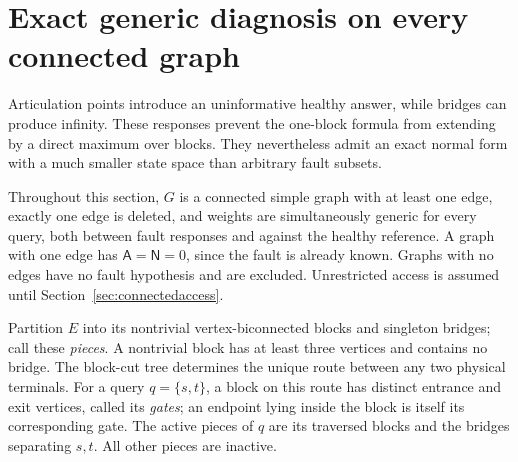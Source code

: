 \documentclass[11pt,letterpaper]{article}
\newcommand{\A}{\mathsf A}
\newcommand{\N}{\mathsf N}
\begin{document}
\section{Exact generic diagnosis on every connected graph}\label{sec:connected}
Articulation points introduce an uninformative healthy answer, while bridges can produce infinity. These responses prevent the one-block formula from extending by a direct maximum over blocks. They nevertheless admit an exact normal form with a much smaller state space than arbitrary fault subsets.

Throughout this section, $G$ is a connected simple graph with at least one edge, exactly one edge is deleted, and weights are simultaneously generic for every query, both between fault responses and against the healthy reference. A graph with one edge has $\A=\N=0$, since the fault is already known. Graphs with no edges have no fault hypothesis and are excluded. Unrestricted access is assumed until Section~\ref{sec:connectedaccess}.

Partition $E$ into its nontrivial vertex-biconnected blocks and singleton bridges; call these \emph{pieces}. A nontrivial block has at least three vertices and contains no bridge. The block-cut tree determines the unique route between any two physical terminals. For a query $q=\{s,t\}$, a block on this route has distinct entrance and exit vertices, called its \emph{gates}; an endpoint lying inside the block is itself its corresponding gate. The active pieces of $q$ are its traversed blocks and the bridges separating $s,t$. All other pieces are inactive.
\end{document}
